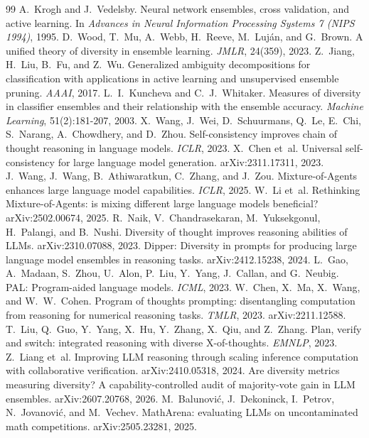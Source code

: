 \documentclass[11pt]{article}
\begin{document}

\begin{thebibliography}{99}
 A.~Krogh and J.~Vedelsby. Neural network ensembles, cross validation, and active learning. In \emph{Advances in Neural Information Processing Systems 7 (NIPS 1994)}, 1995.
 D.~Wood, T.~Mu, A.~Webb, H.~Reeve, M.~Luj\'an, and G.~Brown. A unified theory of diversity in ensemble learning. \emph{JMLR}, 24(359), 2023.
 Z.~Jiang, H.~Liu, B.~Fu, and Z.~Wu. Generalized ambiguity decompositions for classification with applications in active learning and unsupervised ensemble pruning. \emph{AAAI}, 2017.
 L.~I.~Kuncheva and C.~J.~Whitaker. Measures of diversity in classifier ensembles and their relationship with the ensemble accuracy. \emph{Machine Learning}, 51(2):181-207, 2003.
 X.~Wang, J.~Wei, D.~Schuurmans, Q.~Le, E.~Chi, S.~Narang, A.~Chowdhery, and D.~Zhou. Self-consistency improves chain of thought reasoning in language models. \emph{ICLR}, 2023.
 X.~Chen et~al. Universal self-consistency for large language model generation. arXiv:2311.17311, 2023.
 J.~Wang, J.~Wang, B.~Athiwaratkun, C.~Zhang, and J.~Zou. Mixture-of-Agents enhances large language model capabilities. \emph{ICLR}, 2025.
 W.~Li et~al. Rethinking Mixture-of-Agents: is mixing different large language models beneficial? arXiv:2502.00674, 2025.
 R.~Naik, V.~Chandrasekaran, M.~Yuksekgonul, H.~Palangi, and B.~Nushi. Diversity of thought improves reasoning abilities of LLMs. arXiv:2310.07088, 2023.
 Dipper: Diversity in prompts for producing large language model ensembles in reasoning tasks. arXiv:2412.15238, 2024.
 L.~Gao, A.~Madaan, S.~Zhou, U.~Alon, P.~Liu, Y.~Yang, J.~Callan, and G.~Neubig. PAL: Program-aided language models. \emph{ICML}, 2023.
 W.~Chen, X.~Ma, X.~Wang, and W.~W.~Cohen. Program of thoughts prompting: disentangling computation from reasoning for numerical reasoning tasks. \emph{TMLR}, 2023. arXiv:2211.12588.
 T.~Liu, Q.~Guo, Y.~Yang, X.~Hu, Y.~Zhang, X.~Qiu, and Z.~Zhang. Plan, verify and switch: integrated reasoning with diverse X-of-thoughts. \emph{EMNLP}, 2023.
 Z.~Liang et~al. Improving LLM reasoning through scaling inference computation with collaborative verification. arXiv:2410.05318, 2024.
 Are diversity metrics measuring diversity? A capability-controlled audit of majority-vote gain in LLM ensembles. arXiv:2607.20768, 2026.
 M.~Balunovi\'c, J.~Dekoninck, I.~Petrov, N.~Jovanovi\'c, and M.~Vechev. MathArena: evaluating LLMs on uncontaminated math competitions. arXiv:2505.23281, 2025.
\end{thebibliography}
\end{document}

